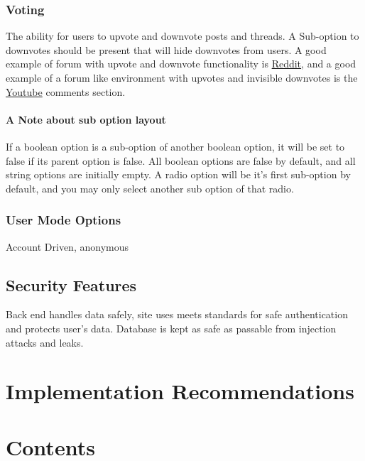 \documentclass[]{article}
\begin{document}
\subsubsection{Voting}
The ability for users to upvote and downvote posts and threads. A Sub-option to downvotes should be present that will hide downvotes from users. 
A good example of forum with upvote and downvote functionality is \href{https://www.reddit.com/}{Reddit}, and a good example of a forum like environment with upvotes and invisible downvotes is the \href{https://www.youtube.com/}{Youtube} comments section. 

\paragraph{A Note about sub option layout}
If a boolean option is a sub-option of another boolean option, it will be set to false if its parent option is false. All boolean options are false by default, and all string options are initially empty. A radio option will be it's first sub-option by default, and you may only select another sub option of that radio.
\\

\subsubsection{User Mode Options}
Account Driven, anonymous 

\subsection{Security Features}
Back end handles data safely, site uses meets standards for safe authentication and protects user's data. Database is kept as safe as passable from injection attacks and leaks. 



\section{Implementation Recommendations}
\newpage
\section{Contents}\label{cont}
\tableofcontents
\end{document}
